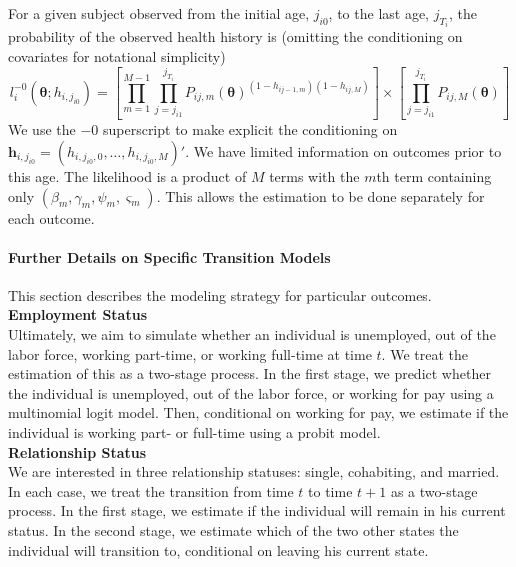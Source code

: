 \noindent For a given subject observed from the initial age, $j_{i0}$, to the last age, $j_{T_i}$, the probability of the observed health history is
(omitting the conditioning on covariates for notational simplicity)
\begin{equation*}
	l^{-0}_i(\mathbf{\theta}; h_{i,j_{i0}}) = \left[\prod_{m=1}^{M-1} \prod_{j=j_{i1}}^{j_{T_i}} P_{ij,m}(\mathbf{\theta})^{(1-h_{ij-1,m})(1-h_{ij,M})} \right] \times \left[\prod_{j=j_{i1}}^{j_{T_i}} P_{ij,M}(\mathbf{\theta}) \right]
\end{equation*}
We use the ${-0}$ superscript to make explicit the conditioning on $\mathbf{h}_{i,j_{i0}} = (h_{i,j_{i0},0},\ldots,h_{i,j_{i0},M})'$. We have limited information on outcomes prior to this age.
The likelihood is a product of $M$ terms with the $m$th term containing only
$(\beta_m, \gamma_m, \psi_m, \varsigma_m)$. This allows the estimation
to be done separately for each outcome. \\

\paragraph{Further Details on Specific Transition Models}
\noindent This section describes the modeling strategy for particular outcomes. \\

\noindent \textbf{Employment Status}\\
\noindent Ultimately, we aim to simulate whether an individual is unemployed, out of the labor force, working part-time, or working full-time at
time $t$. We treat the estimation of this as a two-stage process. In the first stage, we predict whether the individual is unemployed, out of
the labor force, or working for pay using a multinomial logit model. Then, conditional on working for pay, we estimate if
the individual is working part- or full-time using a probit model. \\

\noindent \textbf{Relationship Status}\\
\noindent We are interested in three relationship statuses: single, cohabiting, and married. In each case, we treat the transition
from time $t$ to time $t+1$ as a two-stage process. In the first stage, we estimate if the individual will remain in his
current status. In the second stage, we estimate which of the two other states the individual will transition to, conditional
on leaving his current state. \\

